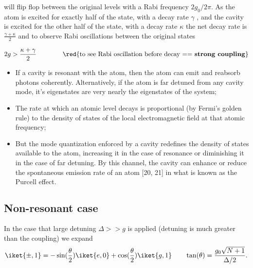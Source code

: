  \noindent   will  flip   flop  between   the
 original  levels   with  a   Rabi  frequency
 $ 2g_0/2\pi  $. As  the atom is  excited for
 exactly half of the state, with a decay rate
 $ \gamma  $ , and  the cavity is excited  for the
 other half  of the state, with  a decay rate
 $   \kappa    $   the    net   decay    rate   is
 $ \frac{\gamma+\kappa}{2}  $ and  to observe
 Rabi   oscillations  between   the  original
 states

 \[
   2g        >        \frac{\kappa+\gamma}{2}
   \qquad\qquad\text{\red{to     see     Rabi
       oscillation     before    decay     ==
       \textbf{strong coupling}}}
 \]

 \begin{framed}\noindent
   \begin{itemize}
   \item  If a  cavity is  resonant with  the
     atom,  then   the  atom  can   emit  and
     reabsorb       photons       coherently.
     Alternatively,  if   the  atom   is  far
     detuned  from  any   cavity  mode,  it’s
     eigenstates   are    very   nearly   the
     eigenstates of the system;
   \item The  rate at  which an  atomic level
     decays   is  proportional   (by  Fermi’s
     golden rule) to the density of states of
     the local electromagnetic  field at that
     atomic frequency;
   \item But  the mode  quantization enforced
     by  a cavity  redefines  the density  of
     states available to the atom, increasing
     it   in  the   case   of  resonance   or
     diminishing  it  in   the  case  of  far
     detuning.  By  this channel,  the cavity
     can  enhance or  reduce the  spontaneous
     emission  rate of  an atom  [20, 21]  in
     what is known as the Purcell effect.
   \end{itemize}
 \end{framed}

 \subsection{Non-resonant
   case}\label{sec:stark-shift}

 \begin{framed}\noindent
   In   the   case    that   large   detuning
   $\Delta >> g$ is applied (detuning is much
   greater than the coupling) we expand
   \begin{equation}
     \iket{\pm,1}      =     -\sin(\frac{\theta}{2})\iket{e,0}     +
     \cos(\frac{\theta}{2})\iket{g,1} \qquad \tan(\theta)     =
     \frac{g_0\sqrt{N+1}}{\Delta/2}.
   \end{equation}
   \noindent
 \end{framed}

